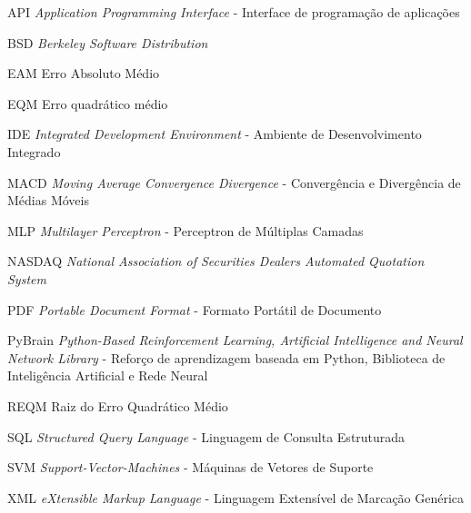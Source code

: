 \begin{siglas}
	\item[API] \textit{Application Programming Interface} - Interface de programação de aplicações
	\item[BSD] \textit{Berkeley Software Distribution}
	\item[EAM] Erro Absoluto Médio
	\item[EQM] Erro quadrático médio
	\item[IDE] \textit{Integrated Development Environment} - Ambiente de Desenvolvimento Integrado
	\item[MACD] \textit{Moving Average Convergence Divergence} - Convergência e Divergência de Médias Móveis
	\item[MLP] \textit{Multilayer Perceptron} - Perceptron de Múltiplas Camadas
	\item[NASDAQ] \textit{National Association of Securities Dealers Automated Quotation System}
	\item[PDF] \textit{Portable Document Format} - Formato Portátil de Documento
	\item[PyBrain] \textit{Python-Based Reinforcement Learning, Artificial Intelligence and Neural Network Library} - Reforço de aprendizagem baseada em Python, Biblioteca de Inteligência Artificial e Rede Neural
	\item[REQM] Raiz do Erro Quadrático Médio
	\item[SQL] \textit{Structured Query Language} - Linguagem de Consulta Estruturada
	\item[SVM] \textit{Support-Vector-Machines } - Máquinas de Vetores de Suporte 
	\item[XML] \textit{eXtensible Markup Language} - Linguagem Extensível de Marcação Genérica
\end{siglas}

